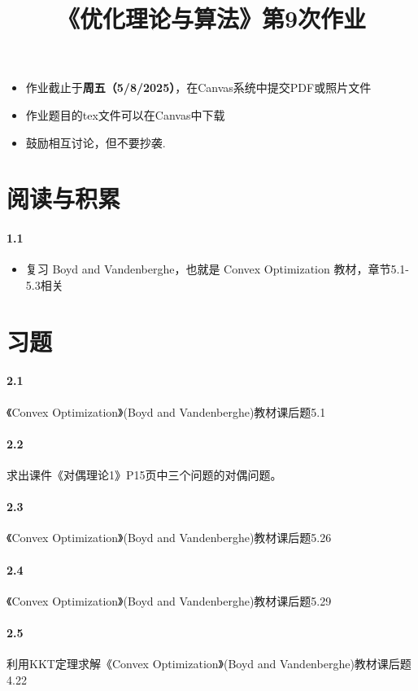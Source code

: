 \documentclass[12pt,a4paper]{article}
\begin{document}
\title{
{《优化理论与算法》第9次作业
}
}
\date{}


\maketitle
\begin{itemize}
	\item 作业截止于{\bf 周五（5/8/2025）}，在Canvas系统中提交PDF或照片文件
	\item 作业题目的tex文件可以在Canvas中下载
	\item 鼓励相互讨论，但不要抄袭.
\end{itemize}

\section{阅读与积累}
\paragraph{1.1}
\begin{itemize}
	\item 复习 Boyd and Vandenberghe，也就是 Convex Optimization 教材，章节5.1-5.3相关
\end{itemize}

\section{习题}


\paragraph{2.1} 《Convex Optimization》(Boyd and Vandenberghe)教材课后题5.1

\paragraph{2.2} 求出课件《对偶理论1》P15页中三个问题的对偶问题。



\paragraph{2.3} 《Convex Optimization》(Boyd and Vandenberghe)教材课后题5.26

\paragraph{2.4} 《Convex Optimization》(Boyd and Vandenberghe)教材课后题5.29

\paragraph{2.5} 利用KKT定理求解《Convex Optimization》(Boyd and Vandenberghe)教材课后题4.22
\end{document}
